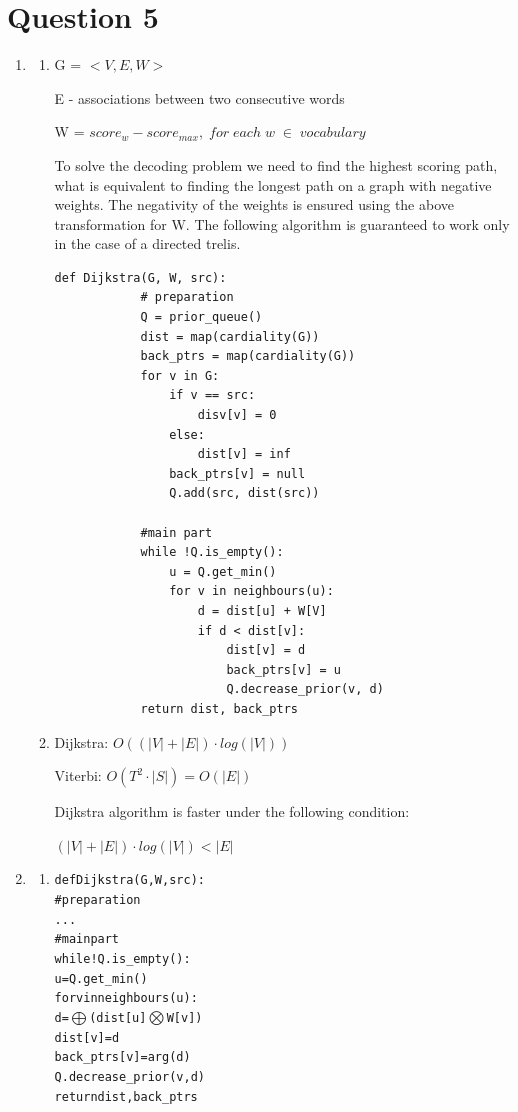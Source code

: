 \documentclass{article}
\begin{document}
\section*{Question 5} 
\begin{enumerate}[label = (\alph*)]
    \item
    \begin{enumerate}[label = (\roman*)]
    \item
    G = $<V, E, W>$
    
    E - associations between two consecutive words
    
    W = $score_{w} - score_{max}, \; for \; each \; w \; \in \; vocabulary $  
    
    To solve the decoding problem we need to find the highest scoring path, what is equivalent to finding the longest path on a graph with negative weights. The negativity of the weights is ensured using the above transformation for W. 
    The following algorithm is guaranteed to work only in the case of a directed trelis.
    
    \begin{Verbatim}[tabsize=4]
    	def Dijkstra(G, W, src):
    		# preparation
    		Q = prior_queue()
    		dist = map(cardiality(G))
    		back_ptrs = map(cardiality(G))
    		for v in G:
    			if v == src: 
    				disv[v] = 0
    			else:
    				dist[v] = inf
    			back_ptrs[v] = null
    			Q.add(src, dist(src))
    			
    		#main part
    		while !Q.is_empty():
    			u = Q.get_min()
    			for v in neighbours(u):
    				d = dist[u] + W[V]
    				if d < dist[v]:
    					dist[v] = d
    					back_ptrs[v] = u
    					Q.decrease_prior(v, d)
    		return dist, back_ptrs
    	\end{Verbatim}
    	
    	\item
    	Dijkstra: $O((|V|+|E|) \cdot log(|V|))$
    	
    	Viterbi: $O(T^2 \cdot |S|) = O(|E|)$
    	
    	Dijkstra algorithm is faster under the following condition:
   
    	 $(|V|+|E|) \cdot log(|V|) < |E|$
    	
	\end{enumerate}
	
	\item
	
	\begin{enumerate}[label = (\roman*)]
    \item
       \begin{alltt}
    	def Dijkstra(G, W, src):
    	    # preparation
    	    ...
    	    #main part
    	    while !Q.is_empty():
    	        u = Q.get_min()
    	        for v in neighbours(u):
    	            d = \(\bigoplus \)(dist[u] \(\bigotimes \) W[v])
    	            dist[v] = d
    	            back_ptrs[v] = arg(d)
                Q.decrease_prior(v, d)
         return dist, back_ptrs
    	\end{alltt}
    	

\end{enumerate}
\end{enumerate}
\end{document}
